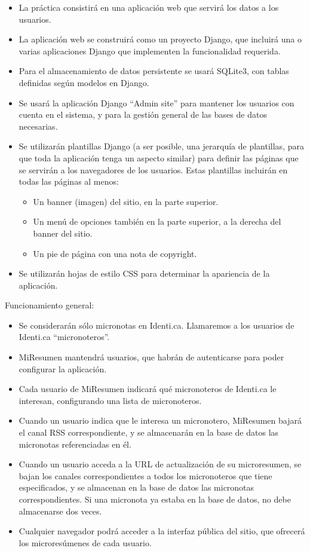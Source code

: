 \begin{itemize}
\item La práctica consistirá en una aplicación web que servirá los datos a los usuarios.

\item La aplicación web se construirá como un proyecto Django, que incluirá una o varias aplicaciones Django que implementen la funcionalidad requerida.

\item Para el almacenamiento de datos persistente se usará SQLite3, con tablas definidas según modelos en Django.

\item Se usará la aplicación Django ``Admin site'' para mantener los usuarios con cuenta en el sistema, y para la gestión general de las bases de datos necesarias.

\item Se utilizarán plantillas Django (a ser posible, una jerarquía de plantillas, para que toda la aplicación tenga un aspecto similar) para definir las páginas que se servirán a los navegadores de los usuarios. Estas plantillas incluirán en todas las páginas al menos:
  \begin{itemize}
  \item Un banner (imagen) del sitio, en la parte superior.
  \item Un menú de opciones también en la parte superior, a la derecha del banner del sitio.
  \item Un pie de página con una nota de copyright.
  \end{itemize}

\item Se utilizarán hojas de estilo CSS para determinar la apariencia de la aplicación.
\end{itemize}

Funcionamiento general:

\begin{itemize}
\item Se considerarán sólo micronotas en Identi.ca. Llamaremos a los usuarios de Identi.ca ``micronoteros''.
\item MiResumen mantendrá usuarios, que habrán de autenticarse para poder configurar la aplicación.
\item Cada usuario de MiResumen indicará qué micronoteros de Identi.ca le interesan, configurando una lista de micronoteros.
\item Cuando un usuario indica que le interesa un micronotero, MiResumen bajará el canal RSS correspondiente, y se almacenarán en la base de datos las micronotas referenciadas en él.
\item Cuando un usuario acceda a la URL de actualización de su microresumen, se bajan los canales correspondientes a todos los micronoteros que tiene especificados, y se almacenan en la base de datos las micronotas correspondientes. Si una micronota ya estaba en la base de datos, no debe almacenarse dos veces.
\item Cualquier navegador podrá acceder a la interfaz pública del sitio, que ofrecerá los microresúmenes de cada usuario.
\end{itemize}

